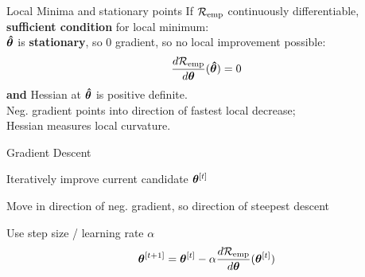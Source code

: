 \documentclass[11pt,compress,t,notes=noshow, xcolor=table]{beamer}
\begin{document}
\begin{frame2}[fs=footnotesize]{Local Minima and stationary points}
If $\mathcal{R}_{\text{emp}}$ continuously differentiable, \textbf{sufficient condition} for local minimum: \\
$\bm{\hat\theta}$ is \textbf{stationary}, so 0 gradient, so no local improvement possible:
$$
\frac{d \mathcal{R}_{\text{emp}}}{d\bm{\theta}}(\bm{\hat\theta}) = 0
$$
\textbf{and} Hessian at $\bm{\hat\theta}$ is positive definite. \\
Neg. gradient points into direction of fastest local decrease;\\
Hessian measures local curvature.
\vfill
\begin{figure}[!htb]
\end{figure}
\end{frame2}


\begin{framei}{Gradient Descent}
\item Iteratively improve  current candidate $\bm{\theta}^{[t]}$ 
\item Move in direction of  neg. gradient, so direction of steepest descent
\item Use step size / learning rate $\alpha$ 
$$
\bm{\theta}^{[t+1]} = \bm{\theta}^{[t]} - \alpha \frac{d \mathcal{R}_{\text{emp}}}{d\bm{\theta}}{(\bm{\theta}^{[t]})}
$$
\end{framei}
\end{document}

